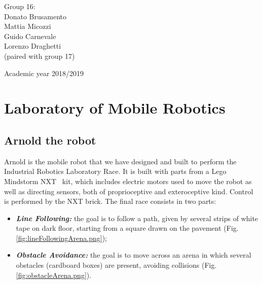\documentclass[a4paper,11pt,oneside]{book}
\begin{document}
		\begin{flushright}
			{\large Group 16:\\
				{Donato Brusamento\\
					Mattia Micozzi\\
					Guido Carnevale\\
					Lorenzo Draghetti\\}
				\vspace{3mm}
			{(paired with group 17)}}\\
		\end{flushright}
		\begin{center}
		\vfill
		      {\large Academic year \@2018/2019} \\
		\end{center}
		
		
		
		\newpage
		\thispagestyle{empty}
		
		
		
		\tableofcontents \thispagestyle{empty}
		\listoffigures\thispagestyle{empty}
		
		
		
		\chapter{Laboratory of Mobile Robotics}
		
		\section*{Arnold the robot}
		
		Arnold is the mobile robot that we have designed and built to perform the Industrial Robotics Laboratory Race. It is built with parts from a Lego Mindstorm NXT\textregistered ~ kit, which includes electric motors used to move the robot as well as directing sensors, both of proprioceptive and exteroceptive kind. Control is performed by the NXT brick. The final race consists in two parts:
		\begin{itemize}                          
			\item \textit{\textbf {Line Following:}} the goal is to follow a path, given by several strips of white tape on dark floor, starting from a square drawn on the pavement (Fig.\ref{fig:lineFollowingArena.png});
			
			\item \textit{\textbf {Obstacle Avoidance:}} the goal is to move across an arena in which several obstacles (cardboard boxes) are present, avoiding collisions (Fig.\ref{fig:obstacleArena.png}).
		
		\end{itemize}
	
\end{document}
